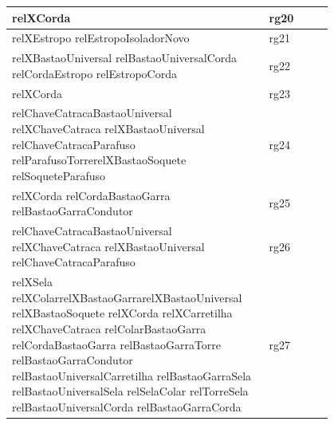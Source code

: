 \documentclass[12pt]{article}
\begin{document}
\begin{table}[H]
\begin{tabular}{|p{0.8\linewidth}|l|}
relXCorda                                                                                                                                                                                                                                                                                                                                 & rg20        \\ \hline
relXEstropo relEstropoIsoladorNovo                                                                                                                                                                                                                                                                                                         & rg21        \\ \hline
relXBastaoUniversal relBastaoUniversalCorda relCordaEstropo relEstropoCorda                                                                                                                                                                                                                                                                & rg22        \\ \hline
relXCorda                                                                                                                                                                                                                                                                                                                                 & rg23        \\ \hline
relChaveCatracaBastaoUniversal relXChaveCatraca relXBastaoUniversal relChaveCatracaParafuso relParafusoTorrerelXBastaoSoquete relSoqueteParafuso                                                                                                                                                                                           & rg24        \\ \hline
relXCorda relCordaBastaoGarra relBastaoGarraCondutor                                                                                                                                                                                                                                                                                      & rg25        \\ \hline
relChaveCatracaBastaoUniversal relXChaveCatraca relXBastaoUniversal relChaveCatracaParafuso                                                                                                                                                                                                                                               & rg26        \\ \hline
relXSela relXColarrelXBastaoGarrarelXBastaoUniversal relXBastaoSoquete relXCorda relXCarretilha relXChaveCatraca relColarBastaoGarra relCordaBastaoGarra relBastaoGarraTorre relBastaoGarraCondutor relBastaoUniversalCarretilha relBastaoGarraSela relBastaoUniversalSela relSelaColar relTorreSela relBastaoUniversalCorda relBastaoGarraCorda & rg27        \\ \hline
\end{tabular}
\end{table}
\end{document}
